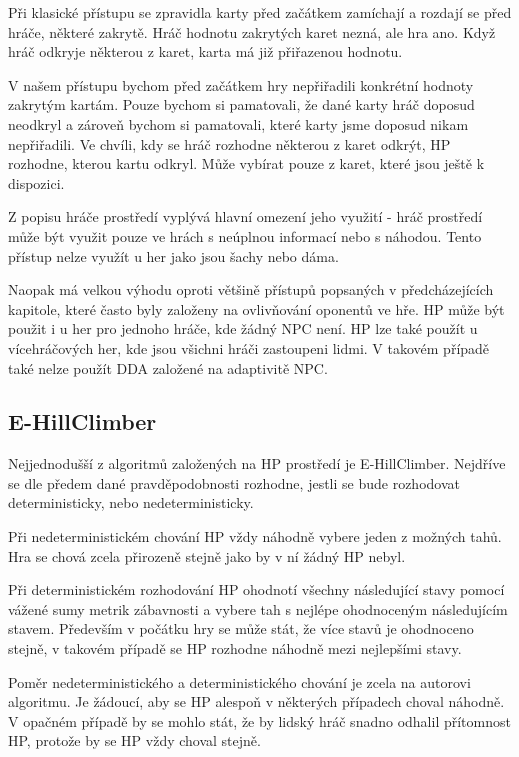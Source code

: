 Při klasické přístupu se zpravidla karty před začátkem zamíchají a rozdají se před hráče, některé zakrytě. Hráč hodnotu zakrytých karet nezná, ale hra ano. Když hráč odkryje některou z karet, karta má již přiřazenou hodnotu. 

V našem přístupu bychom před začátkem hry nepřiřadili konkrétní hodnoty zakrytým kartám. Pouze bychom si pamatovali, že dané karty hráč doposud neodkryl a zároveň bychom si pamatovali, které karty jsme doposud nikam nepřiřadili. Ve chvíli, kdy se hráč rozhodne některou z karet odkrýt, HP rozhodne, kterou kartu odkryl. Může vybírat pouze z karet, které jsou ještě k dispozici.

Z popisu hráče prostředí vyplývá hlavní omezení jeho využití - hráč prostředí může být využit pouze ve hrách s neúplnou informací nebo s náhodou. Tento přístup nelze využít u her jako jsou šachy nebo dáma.

Naopak má velkou výhodu oproti většině přístupů popsaných v předcházejících kapitole, které často byly založeny na ovlivňování oponentů ve hře. HP může být použit i u her pro jednoho hráče, kde žádný NPC není. HP lze také použít u vícehráčových her, kde jsou všichni hráči zastoupeni lidmi. V takovém případě také nelze použít DDA založené na adaptivitě NPC.

\subsection{E-HillClimber}

Nejjednodušší z algoritmů založených na HP prostředí je E-HillClimber. Nejdříve se dle předem dané pravděpodobnosti rozhodne, jestli se bude rozhodovat deterministicky, nebo nedeterministicky.

Při nedeterministickém chování HP vždy náhodně vybere jeden z možných tahů. Hra se chová zcela přirozeně stejně jako by v ní žádný HP nebyl.

Při deterministickém rozhodování HP ohodnotí všechny následující stavy pomocí vážené sumy metrik zábavnosti a vybere tah s nejlépe ohodnoceným následujícím stavem. Především v počátku hry se může stát, že více stavů je ohodnoceno stejně, v takovém případě se HP rozhodne náhodně mezi nejlepšími stavy.

Poměr nedeterministického a deterministického chování je zcela na autorovi algoritmu. Je žádoucí, aby se HP alespoň v některých případech choval náhodně. V opačném případě by se mohlo stát, že by lidský hráč snadno odhalil přítomnost HP, protože by se HP vždy choval stejně.

